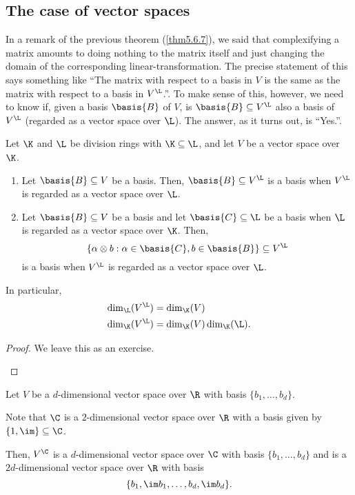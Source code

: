 \subsection{The case of vector spaces}

In a remark of the previous theorem (\cref{thm5.6.7}), we said that complexifying a matrix amounts to doing nothing to the matrix itself and just changing the domain of the corresponding linear-transformation.  The precise statement of this says something like ``The matrix with respect to a basis in $V$ is the same as the matrix with respect to a basis in $V^{\L}$.''.  To make sense of this, however, we need to know if, given a basis $\basis{B}$ of $V$, is $\basis{B}\subseteq V^{\L}$ also a basis of $V^{\L}$ (regarded as a vector space over $\L$).  The answer, as it turns out, is ``Yes.''.
\begin{prp}{}{}
	Let $\K$ and $\L$ be division rings with $\K \subseteq \L$, and let $V$ be a vector space over $\K$.
	\begin{enumerate}
		\item Let $\basis{B}\subseteq V$ be a basis.  Then, $\basis{B}\subseteq V^{\L}$ is a basis when $V^{\L}$ is regarded as a vector space over $\L$.
		\item Let $\basis{B}\subseteq V$ be a basis and let $\basis{C}\subseteq \L$ be a basis when $\L$ is regarded as a vector space over $\K$.  Then,
		\begin{equation}
			\left\{ \alpha \otimes b:\alpha \in \basis{C},b\in \basis{B}\right\} \subseteq V^{\L}
		\end{equation}
		is a basis when $V^{\L}$ is regarded as a vector space over $\L$.
	\end{enumerate}
	\begin{rmk}
		In particular,
		\begin{align}
			\dim _{\L}(V^{\L}) & =\dim _{\K}(V) \\
			\dim _{\K}(V^{\L}) & =\dim _{\K}(V)\dim _{\K}(\L ).
		\end{align}
	\end{rmk}
	\begin{proof}
		We leave this as an exercise.
		\begin{exr}[breakable=false]{}{}
			
		\end{exr}
	\end{proof}
\end{prp}
\begin{exm}{}{}
	Let $V$ be a $d$-dimensional vector space over $\R$ with basis $\{ b_1,\ldots ,b_d\}$.
	
	Note that $\C$ is a $2$-dimensional vector space over $\R$ with a basis given by $\{ 1,\im \} \subseteq \C$.
	
	Then, $V^{\C}$ is a $d$-dimensional vector space over $\C$ with basis $\{ b_1,\ldots ,b_d\}$ and is a $2d$-dimensional vector space over $\R$ with basis
	\begin{equation}
		\{ b_1,\im b_1,\ldots ,b_d,\im b_d\} .
	\end{equation}
\end{exm}
